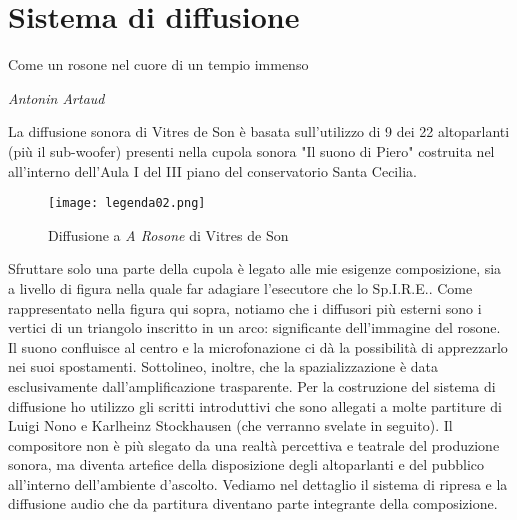 
\chapter{Sistema di diffusione}
\label{chp:Sistema di diffusione}

\epigraph{Come un rosone nel cuore di un tempio immenso}{\textit{Antonin Artaud}}

La diffusione sonora di Vitres de Son è basata sull'utilizzo di 9 dei 22 altoparlanti (più il sub-woofer) presenti nella cupola sonora "Il suono di Piero" costruita nel all'interno dell'Aula I del III piano del conservatorio Santa Cecilia. \begin{figure}[!htbp]
\begin{center}
\texttt{[image: legenda02.png]}
\caption{Diffusione a \textit{A Rosone} di Vitres de Son}
\label{default}
\end{center}
\end{figure}Sfruttare solo una parte della cupola è legato alle mie esigenze composizione, sia a livello di figura nella quale far adagiare l'esecutore che lo Sp.I.R.E.. Come rappresentato nella figura qui sopra, notiamo che i diffusori più esterni sono i vertici di un triangolo inscritto in un arco: significante dell'immagine del rosone. Il suono confluisce al centro e la microfonazione ci dà la possibilità di apprezzarlo nei suoi spostamenti. Sottolineo, inoltre, che la spazializzazione è data esclusivamente dall'amplificazione trasparente.
Per la costruzione del sistema di diffusione ho utilizzo gli scritti introduttivi che sono allegati a molte partiture di Luigi Nono e Karlheinz Stockhausen (che verranno svelate in seguito). Il compositore non è più slegato da una realtà percettiva e teatrale del produzione sonora, ma diventa artefice della disposizione degli altoparlanti e del pubblico all'interno dell'ambiente d'ascolto.
Vediamo nel dettaglio il sistema di ripresa e la diffusione audio che da partitura diventano parte integrante della composizione.

